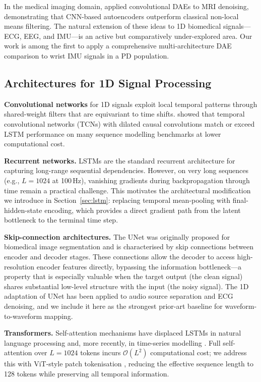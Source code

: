 \documentclass{article}
\begin{document}
In the medical imaging domain, \citet{gondara2016medical} applied convolutional
DAEs to MRI denoising, demonstrating that CNN-based autoencoders outperform
classical non-local means filtering.
The natural extension of these ideas to 1D biomedical signals---ECG, EEG,
and IMU---is an active but comparatively under-explored area.
Our work is among the first to apply a comprehensive multi-architecture DAE
comparison to wrist IMU signals in a PD population.

\subsection{Architectures for 1D Signal Processing}

\textbf{Convolutional networks} for 1D signals exploit local temporal patterns
through shared-weight filters that are equivariant to time shifts.
\citet{bai2018tcn} showed that temporal convolutional networks (TCNs) with
dilated causal convolutions match or exceed LSTM performance on many sequence
modelling benchmarks at lower computational cost.

\textbf{Recurrent networks.}
LSTMs \citep{hochreiter1997long} are the standard recurrent architecture for
capturing long-range sequential dependencies.
However, on very long sequences (e.g., $L = 1024$ at 100\,Hz), vanishing
gradients during backpropagation through time remain a practical challenge.
This motivates the architectural modification we introduce in
Section~\ref{sec:lstm}: replacing temporal mean-pooling with final-hidden-state
encoding, which provides a direct gradient path from the latent bottleneck to
the terminal time step.

\textbf{Skip-connection architectures.}
The UNet \citep{ronneberger2015unet} was originally proposed for biomedical
image segmentation and is characterised by skip connections between
encoder and decoder stages.
These connections allow the decoder to access high-resolution encoder features
directly, bypassing the information bottleneck—a property that is especially
valuable when the target output (the clean signal) shares substantial
low-level structure with the input (the noisy signal).
The 1D adaptation of UNet has been applied to audio source separation and ECG
denoising, and we include it here as the strongest prior-art baseline for
waveform-to-waveform mapping.

\textbf{Transformers.}
Self-attention mechanisms \citep{vaswani2017attention} have displaced LSTMs in
natural language processing and, more recently, in time-series modelling
\citep{liu2022time}.
Full self-attention over $L = 1024$ tokens incurs $\mathcal{O}(L^2)$
computational cost; we address this with ViT-style patch tokenisation
\citep{dosovitskiy2021vit}, reducing the effective sequence length to 128
tokens while preserving all temporal information.
\end{document}
